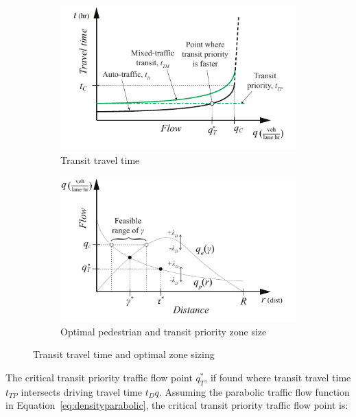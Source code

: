\documentclass{article}
\begin{document}
\begin{figure}[!ht]
     \centering
     \hfill
     \begin{subfigure}[b]{0.45\textwidth}
         \centering
         \includegraphics[width=\textwidth]{diagram_transit_traveltime}
        \caption{Transit travel time}
         \label{fig:transittraveltime}
     \end{subfigure}
     \hfill
     \begin{subfigure}[b]{0.45\textwidth}
         \centering
         \includegraphics[width=\textwidth]{diagram_flow_combo}
         \caption{Optimal pedestrian and transit priority zone size}
         \label{fig:flowcombo}
     \end{subfigure}
     \hfill
     \caption{Transit travel time and optimal zone sizing}
\end{figure}

The critical transit priority traffic flow point $q^*_T$, if found where transit travel time $t_{TP}$ intersects driving travel time $t_D{q}$. Assuming the parabolic traffic flow function in Equation~\eqref{eq:densityparabolic}, the critical transit priority traffic flow point is:
\end{document}
